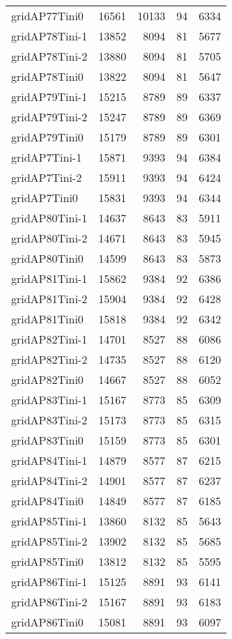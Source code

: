 \documentclass[../../../thesis.tex]{subfiles}
\begin{document}
\begin{longtable}{lrrrr}
gridAP77Tini0 & 16561 & 10133 & 94 & 6334 \\
gridAP78Tini-1 & 13852 & 8094 & 81 & 5677 \\
gridAP78Tini-2 & 13880 & 8094 & 81 & 5705 \\
gridAP78Tini0 & 13822 & 8094 & 81 & 5647 \\
gridAP79Tini-1 & 15215 & 8789 & 89 & 6337 \\
gridAP79Tini-2 & 15247 & 8789 & 89 & 6369 \\
gridAP79Tini0 & 15179 & 8789 & 89 & 6301 \\
gridAP7Tini-1 & 15871 & 9393 & 94 & 6384 \\
gridAP7Tini-2 & 15911 & 9393 & 94 & 6424 \\
gridAP7Tini0 & 15831 & 9393 & 94 & 6344 \\
gridAP80Tini-1 & 14637 & 8643 & 83 & 5911 \\
gridAP80Tini-2 & 14671 & 8643 & 83 & 5945 \\
gridAP80Tini0 & 14599 & 8643 & 83 & 5873 \\
gridAP81Tini-1 & 15862 & 9384 & 92 & 6386 \\
gridAP81Tini-2 & 15904 & 9384 & 92 & 6428 \\
gridAP81Tini0 & 15818 & 9384 & 92 & 6342 \\
gridAP82Tini-1 & 14701 & 8527 & 88 & 6086 \\
gridAP82Tini-2 & 14735 & 8527 & 88 & 6120 \\
gridAP82Tini0 & 14667 & 8527 & 88 & 6052 \\
gridAP83Tini-1 & 15167 & 8773 & 85 & 6309 \\
gridAP83Tini-2 & 15173 & 8773 & 85 & 6315 \\
gridAP83Tini0 & 15159 & 8773 & 85 & 6301 \\
gridAP84Tini-1 & 14879 & 8577 & 87 & 6215 \\
gridAP84Tini-2 & 14901 & 8577 & 87 & 6237 \\
gridAP84Tini0 & 14849 & 8577 & 87 & 6185 \\
gridAP85Tini-1 & 13860 & 8132 & 85 & 5643 \\
gridAP85Tini-2 & 13902 & 8132 & 85 & 5685 \\
gridAP85Tini0 & 13812 & 8132 & 85 & 5595 \\
gridAP86Tini-1 & 15125 & 8891 & 93 & 6141 \\
gridAP86Tini-2 & 15167 & 8891 & 93 & 6183 \\
gridAP86Tini0 & 15081 & 8891 & 93 & 6097 \\

\end{longtable}
\end{document}
